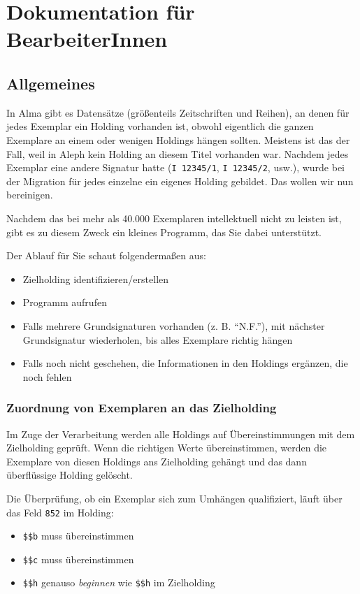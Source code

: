 \documentclass[10pt, a4paper]{scrartcl}
\begin{document}
\section{Dokumentation für BearbeiterInnen}
\label{sec:org9d5b6b4}
\subsection{Allgemeines}
\label{sec:org862022e}
In Alma gibt es Datensätze (größenteils Zeitschriften und Reihen), an denen
für jedes Exemplar ein Holding vorhanden ist, obwohl eigentlich die ganzen
Exemplare an einem oder wenigen Holdings hängen sollten. Meistens ist das
der Fall, weil in Aleph kein Holding an diesem Titel vorhanden war. Nachdem
jedes Exemplar eine andere Signatur hatte (\texttt{I 12345/1}, \texttt{I 12345/2}, usw.),
wurde bei der Migration für jedes einzelne ein eigenes Holding gebildet. Das
wollen wir nun bereinigen.

Nachdem das bei mehr als 40.000 Exemplaren intellektuell nicht zu leisten
ist, gibt es zu diesem Zweck ein kleines Programm, das Sie dabei
unterstützt.

Der Ablauf für Sie schaut folgendermaßen aus:

\begin{itemize}
\item Zielholding identifizieren/erstellen
\item Programm aufrufen
\item Falls mehrere Grundsignaturen vorhanden (z. B. "`N.F."'), mit nächster
Grundsignatur wiederholen, bis alles Exemplare richtig hängen
\item Falls noch nicht geschehen, die Informationen in den Holdings ergänzen,
die noch fehlen
\end{itemize}

\subsubsection{Zuordnung von Exemplaren an das Zielholding}
\label{sec:orgae27b8f}
Im Zuge der Verarbeitung werden alle Holdings auf Übereinstimmungen mit dem
Zielholding geprüft. Wenn die richtigen Werte übereinstimmen, werden die
Exemplare von diesen Holdings ans Zielholding gehängt und das dann
überflüssige Holding gelöscht.

Die Überprüfung, ob ein Exemplar sich zum Umhängen qualifiziert, läuft
über das Feld \texttt{852} im Holding:

\begin{itemize}
\item \texttt{\$\$b} muss übereinstimmen
\item \texttt{\$\$c} muss übereinstimmen
\item \texttt{\$\$h} genauso \emph{beginnen} wie \texttt{\$\$h} im Zielholding
\end{itemize}
\end{document}

